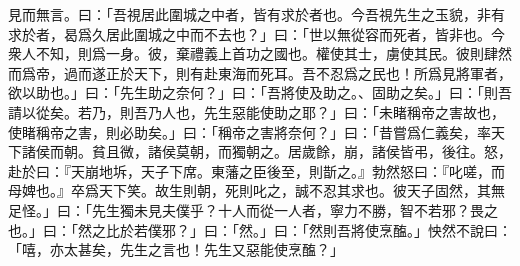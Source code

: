 見而無言。曰：「吾視居此圍城之中者，皆有求於者也。今吾視先生之玉貌，非有求於者，曷爲久居此圍城之中而不去也？」曰：「世以無從容而死者，皆非也。今衆人不知，則爲一身。彼，棄禮義上首功之國也。權使其士，虜使其民。彼則肆然而爲帝，過而遂正於天下，則有赴東海而死耳。吾不忍爲之民也！所爲見將軍者，欲以助也。」曰：「先生助之奈何？」曰：「吾將使及助之。、固助之矣。」曰：「則吾請以從矣。若乃，則吾乃人也，先生惡能使助之耶？」曰：「未睹稱帝之害故也，使睹稱帝之害，則必助矣。」曰：「稱帝之害將奈何？」曰：「昔嘗爲仁義矣，率天下諸侯而朝。貧且微，諸侯莫朝，而獨朝之。居歲餘，崩，諸侯皆弔，後往。怒，赴於曰：『天崩地坼，天子下席。東藩之臣後至，則斮之。』勃然怒曰：『叱嗟，而母婢也。』卒爲天下笑。故生則朝，死則叱之，誠不忍其求也。彼天子固然，其無足怪。」曰：「先生獨未見夫僕乎？十人而從一人者，寧力不勝，智不若邪？畏之也。」曰：「然之比於若僕邪？」曰：「然。」曰：「然則吾將使烹醢。」怏然不說曰：「嘻，亦太甚矣，先生之言也！先生又惡能使烹醢？」

